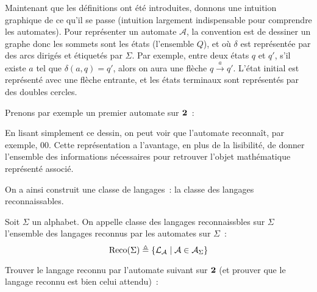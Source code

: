 Maintenant que les définitions ont été introduites, donnons une intuition
graphique de ce qu'il se passe (intuition largement indispensable pour
comprendre les automates). Pour représenter un automate $\mathcal A$, la
convention est de dessiner un graphe donc les sommets sont les états (l'ensemble
$Q$), et où $\delta$ est représentée par des arcs dirigés et étiquetés par
$\Sigma$. Par exemple, entre deux états $q$ et $q'$, s'il existe $a$ tel que
$\delta(a,q) = q'$, alors on aura une flèche $q \xrightarrow{a} q'$. L'état
initial est représenté avec une flèche entrante, et les états terminaux sont
représentés par des doubles cercles.

Prenons par exemple un premier automate sur $\boldsymbol{2}$~:

\begin{figure}[H]
  \centering
\end{figure}

En lisant simplement ce dessin, on peut voir que l'automate reconnaît, par
exemple, $00$. Cette représentation a l'avantage, en plus de la lisibilité,
de donner l'ensemble des informations nécessaires pour retrouver l'objet
mathématique représenté associé.

On a ainsi construit une classe de langages~: la classe des langages
reconnaissables.

\begin{definition}
  Soit $\Sigma$ un alphabet. On appelle classe des langages reconnaissbles sur
  $\Sigma$ l'ensemble des langages reconnus par les automates sur $\Sigma$~:
  \[\operatorname{Reco}(\Sigma) \triangleq \{\mathcal L_\mathcal A \mid
  \mathcal A \in \mathcal A_\Sigma\}\]
\end{definition}

\begin{exercise}
  Trouver le langage reconnu par l'automate suivant sur $\boldsymbol{2}$ (et prouver que
  le langage reconnu est bien celui attendu)~:
  \begin{figure}[H]
    \centering
  \end{figure}
\end{exercise}

